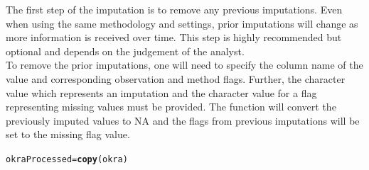 \documentclass[nojss]{jss}\usepackage[]{graphicx}\usepackage[]{color}
\makeatletter
\newcommand{\hlstd}[1]{\textcolor[rgb]{0.345,0.345,0.345}{#1}}%
\newcommand{\hlkwb}[1]{\textcolor[rgb]{0.69,0.353,0.396}{#1}}%
\newcommand{\hlkwd}[1]{\textcolor[rgb]{0.737,0.353,0.396}{\textbf{#1}}}%
\newenvironment{kframe}{%
 \def\at@end@of@kframe{}%
 \ifinner\ifhmode%
  \def\at@end@of@kframe{\end{minipage}}%
  \begin{minipage}{\columnwidth}%
 \fi\fi%
 \def\FrameCommand##1{\hskip\@totalleftmargin \hskip-\fboxsep
 \colorbox{shadecolor}{##1}\hskip-\fboxsep
     \hskip-\linewidth \hskip-\@totalleftmargin \hskip\columnwidth}%
 \MakeFramed {\advance\hsize-\width
   \@totalleftmargin\z@ \linewidth\hsize
   \@setminipage}}%
 {\par\unskip\endMakeFramed%
 \at@end@of@kframe}
\newenvironment{knitrout}{}{} %
\makeatother
\begin{document}
The first step of the imputation is to remove any previous imputations.
Even when using the same methodology and settings, prior
imputations will change as more information is received over time. This
step is highly recommended but optional and depends on the judgement
of the analyst. \\

To remove the prior imputations, one will need to specify the column
name of the value and corresponding observation and method flags.  Further,
the character value which represents an imputation and the character value
for a flag representing missing values must be provided. The function will
convert the previously imputed values to NA
and the flags from previous imputations will be set to the missing flag value.

\begin{knitrout}
\color{fgcolor}\begin{kframe}
\begin{alltt}
\hlstd{okraProcessed} \hlkwb{=} \hlkwd{copy}\hlstd{(okra)}


\end{alltt}
\end{kframe}
\end{knitrout}
\end{document}
